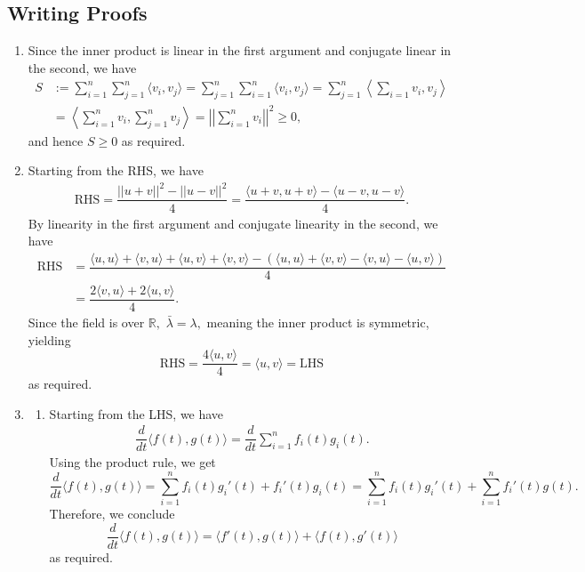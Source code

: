 \documentclass[12pt]{article}
\begin{document}
\subsection{Writing Proofs}
\begin{enumerate}
  \item Since the inner product is linear in the first argument and
    conjugate linear in the second, we have
    \begin{align*}
      S &:= \sum_{i = 1} ^{n} \sum_{j = 1}^{n} \langle v_i, v_j
      \rangle = \sum_{j = 1}^{n} \sum_{i = 1}^{n} \langle v_i,
      v_j\rangle = \sum_{j = 1}^{n} \left\langle \sum_{i = 1}v_i, v_j
      \right\rangle \\
      &= \left\langle \sum_{i = 1}^{n} v_i, \sum_{j = 1}^{n}
      v_j\right\rangle = \left|\left| \sum_{i =
      1}^{n}v_i\right|\right|^2 \geq 0,
    \end{align*}
    and hence $S \geq 0$ as required.

  \item Starting from the RHS, we have
    \begin{align*}
      \text{RHS} =  \dfrac{||u + v||^2 - ||u - v||^2}{4} =
      \dfrac{\langle u + v, u + v\rangle - \langle u - v, u - v\rangle}{4}.
    \end{align*}
    By linearity in the first argument and conjugate linearity in the
    second, we have
    \begin{align*}
      \text{RHS}  &= \dfrac{\langle u, u \rangle + \langle v, u
        \rangle + \langle u, v \rangle + \langle v, v \rangle -
        (\langle u, u \rangle + \langle v, v \rangle - \langle v, u
      \rangle - \langle u, v \rangle )}{4} \\
      &= \dfrac{2 \langle v, u \rangle + 2 \langle u, v\rangle}{4}.
    \end{align*}
    Since the field is over $\mathbb R, $ $\bar \lambda = \lambda,$
    meaning the inner product is symmetric, yielding $$
    \text{RHS} = \dfrac{4 \langle u, v \rangle}4{} = \langle u, v
    \rangle = \text{LHS}
    $$
    as required.

  \item
    \begin{enumerate}
      \item Starting from the LHS, we have
        \begin{align*}
          \dfrac{d}{dt} \langle f(t), g(t) \rangle = \dfrac{d}{dt}
          \sum_{i = 1}^{n} f_i(t) g_i(t).
        \end{align*}
        Using the product rule, we get
        $$
        \dfrac{d}{dt} \langle f(t), g(t) \rangle = \sum_{i = 1}^{n}
        f_i(t) g_i'(t) + f_i'(t) g_i(t) = \sum_{i = 1}^{n} f_i(t)
        g_i'(t) + \sum_{i = 1}^{n} f_i'(t) g(t).
        $$
        Therefore, we conclude $$
        \dfrac{d}{dt} \langle f(t), g(t)\rangle = \langle f'(t),
        g(t)\rangle + \langle f(t),g'(t)\rangle
        $$
        as required.


\end{enumerate}
\end{enumerate}
\end{document}
